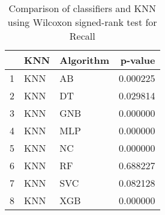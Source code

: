 \begin{table}
\footnotesize
\caption{Comparison of classifiers and KNN using Wilcoxon signed-rank test for Recall}
\label{tab:KNN wilcoxon Recall comparison}
\begin{tabular}{lllr}
\hline
 & KNN & Algorithm & p-value \\
\hline
1 & KNN & AB & 0.000225 \\
2 & KNN & DT & 0.029814 \\
3 & KNN & GNB & 0.000000 \\
4 & KNN & MLP & 0.000000 \\
5 & KNN & NC & 0.000000 \\
6 & KNN & RF & 0.688227 \\
7 & KNN & SVC & 0.082128 \\
8 & KNN & XGB & 0.000000 \\
\hline
\end{tabular}
\end{table}
